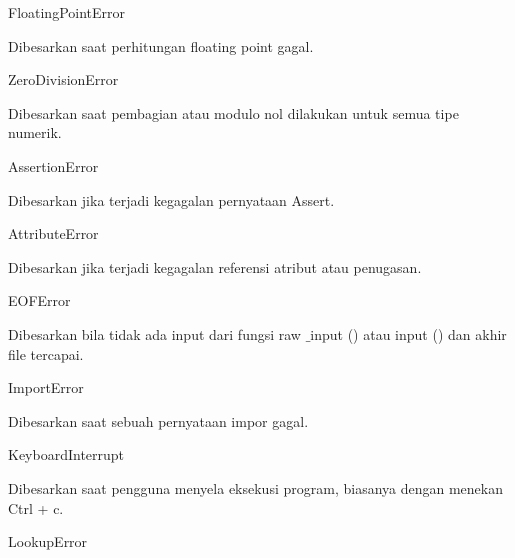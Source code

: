 \vspace{12pt}
\noindent 
FloatingPointError \hspace*{0.5in}  \par
\noindent 
Dibesarkan saat perhitungan floating point gagal. \par
\vspace{12pt}
\noindent 
ZeroDivisionError \hspace*{0.5in}  \par
\noindent 
Dibesarkan saat pembagian atau modulo nol dilakukan untuk semua tipe numerik. \par
\vspace{12pt}
\vspace{12pt}
\noindent 
AssertionError \hspace*{0.5in}  \hspace*{0.5in}  \par
\noindent 
Dibesarkan jika terjadi kegagalan pernyataan Assert. \par
\vspace{12pt}
\noindent 
AttributeError \hspace*{0.5in}  \hspace*{0.5in}  \par
\noindent 
Dibesarkan jika terjadi kegagalan referensi atribut atau penugasan. \par
\vspace{12pt}
\noindent 
EOFError \hspace*{0.5in}  \par
\noindent 
Dibesarkan bila tidak ada input dari fungsi raw $  \_  $input () atau input () dan akhir file tercapai. \par
\vspace{12pt}
\noindent 
ImportError \hspace*{0.5in}  \hspace*{0.5in}  \par
\noindent 
Dibesarkan saat sebuah pernyataan impor gagal. \par
\vspace{12pt}
\noindent 
KeyboardInterrupt \hspace*{0.5in}  \par
\noindent 
Dibesarkan saat pengguna menyela eksekusi program, biasanya dengan menekan Ctrl + c. \par
\vspace{12pt}
\noindent 
LookupError \hspace*{0.5in}  \hspace*{0.5in}  \par
